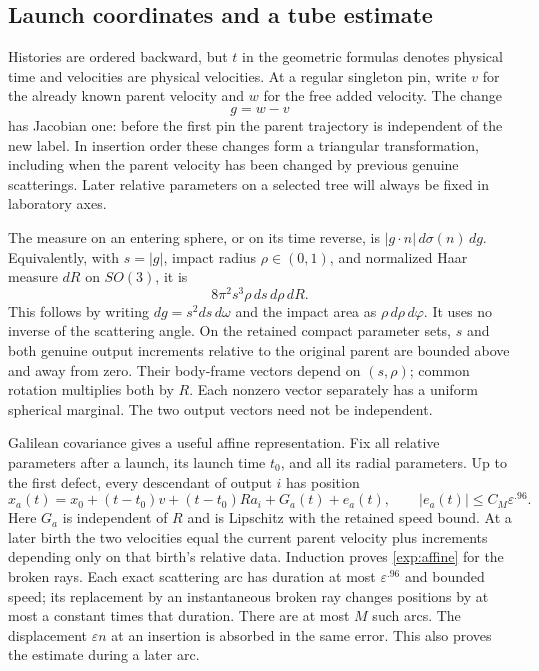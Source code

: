 \subsection{Launch coordinates and a tube estimate}

Histories are ordered backward, but $t$ in the geometric formulas denotes
physical time and velocities are physical velocities.  At a regular singleton pin,
write $v$ for the already known parent velocity and $w$ for the free added
velocity.  The change
\begin{equation}
\label{exp:relative-chart}
 g=w-v
\end{equation}
has Jacobian one: before the first pin the parent trajectory is independent
of the new label.  In insertion order these changes form a triangular
transformation, including when the parent velocity has been changed by
previous genuine scatterings.  Later relative parameters on a selected tree
will always be fixed in laboratory axes.

The measure on an entering sphere, or on its time reverse, is
$|g\cdot n|\,d\sigma(n)\,dg$.  Equivalently, with $s=|g|$, impact radius
$\rho\in(0,1)$, and normalized Haar measure $dR$ on $SO(3)$, it is
\begin{equation}
\label{exp:rotation-measure}
 8\pi^2s^3\rho\,ds\,d\rho\,dR.
\end{equation}
This follows by writing $dg=s^2ds\,d\omega$ and the impact area as
$\rho\,d\rho\,d\varphi$.  It uses no inverse of the scattering angle.  On
the retained compact parameter sets, $s$ and both genuine output increments
relative to the original parent are bounded above and away from zero.
Their body-frame vectors depend on $(s,\rho)$; common rotation multiplies
both by $R$.  Each nonzero vector separately has a uniform spherical
marginal.  The two output vectors need not be independent.

Galilean covariance gives a useful affine representation.  Fix all relative
parameters after a launch, its launch time $t_0$, and all its radial
parameters.  Up to the first defect, every descendant of output $i$ has
position
\begin{equation}
\label{exp:affine}
 x_a(t)=x_0+(t-t_0)v+(t-t_0)R a_i+G_a(t)+e_a(t),
 \qquad |e_a(t)|\le C_M\varepsilon^{.96}.
\end{equation}
Here $G_a$ is independent of $R$ and is Lipschitz with the retained speed
bound.  At a later birth the two velocities equal the current parent
velocity plus increments depending only on that birth's relative data.
Induction proves \eqref{exp:affine} for the broken rays.  Each exact
scattering arc has duration at most $\varepsilon^{.96}$ and bounded speed;
its replacement by an instantaneous broken ray changes positions by at
most a constant times that duration.  There are at most $M$ such arcs.
The displacement $\varepsilon n$ at an insertion is absorbed in the same
error.  This also proves the estimate during a later arc.

